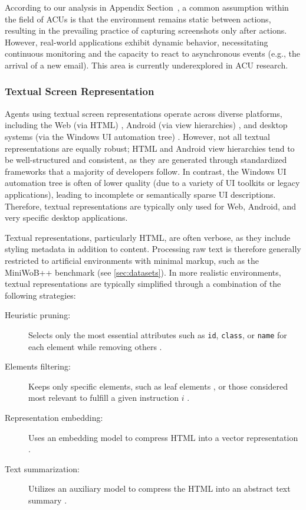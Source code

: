 According to our analysis in Appendix Section~, a common assumption within the field of ACUs is that the environment remains static between actions, resulting in the prevailing practice of capturing screenshots only after actions. However, real-world applications exhibit dynamic behavior, necessitating continuous monitoring and the capacity to react to asynchronous events (e.g., the arrival of a new email). This area is currently underexplored in ACU research.

\subsubsection{Textual Screen Representation}\label{sec:obervation_space_image_text}
Agents using textual screen representations operate across diverse platforms, including the Web (via HTML) , Android (via view hierarchies) , and desktop systems (via the Windows UI automation tree) .
However, not all textual representations are equally robust; HTML and Android view hierarchies tend to be well-structured and consistent, as they are generated through standardized frameworks that a majority of developers follow. In contrast, the Windows UI automation tree is often of lower quality (due to a variety of UI toolkits or legacy applications), leading to incomplete or semantically sparse UI descriptions. Therefore, textual representations are typically only used for Web, Android, and very specific desktop applications.

Textual representations, particularly HTML, are often verbose, as they include styling metadata in addition to content. Processing raw text  is therefore generally restricted to artificial environments with minimal markup, such as the MiniWoB++ benchmark (see \cref{sec:datasets}). 
In more realistic environments, textual representations are typically simplified through a combination of the following strategies:

\begin{description}
    \item[Heuristic pruning:] 
        Selects only the most essential attributes such as \texttt{id}, \texttt{class}, or \texttt{name} for each element while removing others .
    \item[Elements filtering:] 
        Keeps only specific elements, such as leaf elements , or those considered most relevant to fulfill a given instruction $i$ .
    \item[Representation embedding:] 
        Uses an embedding model to compress HTML into a vector representation .
    \item[Text summarization:]
        Utilizes an auxiliary model to compress the HTML into an abstract text summary .
\end{description}

